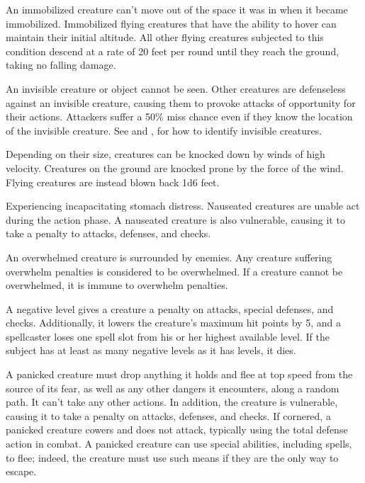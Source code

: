  An immobilized creature can't move out of the space it was in when it became immobilized. Immobilized flying creatures that have the ability to hover can maintain their initial altitude. All other flying creatures subjected to this condition descend at a rate of 20 feet per round until they reach the ground, taking no falling damage.

 An invisible creature or object cannot be seen. Other creatures are defenseless against an invisible creature, causing them to provoke attacks of opportunity for their actions. Attackers suffer a 50\% miss chance even if they know the location of the invisible creature. See  and , for how to identify invisible creatures.

 Depending on their size, creatures can be knocked down by winds of high velocity. Creatures on the ground are knocked prone by the force of the wind. Flying creatures are instead blown back 1d6  feet.

 Experiencing incapacitating stomach distress. Nauseated creatures are unable act during the action phase. A nauseated creature is also vulnerable, causing it to take a  penalty to attacks, defenses, and checks.

 An overwhelmed creature is surrounded by enemies. Any creature suffering overwhelm penalties is considered to be overwhelmed. If a creature cannot be overwhelmed, it is immune to overwhelm penalties.

 A negative level gives a creature a  penalty on attacks, special defenses, and checks. Additionally, it lowers the creature's maximum hit points by 5, and a spellcaster loses one spell slot from his or her highest available level. If the subject has at least as many negative levels as it has levels, it dies.

 A panicked creature must drop anything it holds and flee at top speed from the source of its fear, as well as any other dangers it encounters, along a random path. It can't take any other actions. In addition, the creature is vulnerable, causing it to take a  penalty on attacks, defenses, and checks. If cornered, a panicked creature cowers and does not attack, typically using the total defense action in combat. A panicked creature can use special abilities, including spells, to flee; indeed, the creature must use such means if they are the only way to escape.

